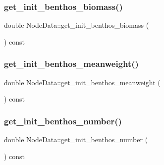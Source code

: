 \subsubsection{\texorpdfstring{get\_init\_benthos\_biomass()}{get\_init\_benthos\_biomass()}}
{\footnotesize\ttfamily double Node\+Data\+::get\+\_\+init\+\_\+benthos\+\_\+biomass (\begin{DoxyParamCaption}{ }\end{DoxyParamCaption}) const\hspace{0.3cm}{\ttfamily [inline]}}

\mbox{\label{class_node_data_ae3a0fcc6c143f8a0d5188a45293c8044}} 
\subsubsection{\texorpdfstring{get\_init\_benthos\_meanweight()}{get\_init\_benthos\_meanweight()}}
{\footnotesize\ttfamily double Node\+Data\+::get\+\_\+init\+\_\+benthos\+\_\+meanweight (\begin{DoxyParamCaption}{ }\end{DoxyParamCaption}) const\hspace{0.3cm}{\ttfamily [inline]}}

\mbox{\label{class_node_data_a83a21fc5bd066b25f7454b7a133a4d0d}} 
\subsubsection{\texorpdfstring{get\_init\_benthos\_number()}{get\_init\_benthos\_number()}}
{\footnotesize\ttfamily double Node\+Data\+::get\+\_\+init\+\_\+benthos\+\_\+number (\begin{DoxyParamCaption}{ }\end{DoxyParamCaption}) const\hspace{0.3cm}{\ttfamily [inline]}}

\mbox{\label{class_node_data_a349a5b2e3705663d25fb82b591e3ca0e}} 
